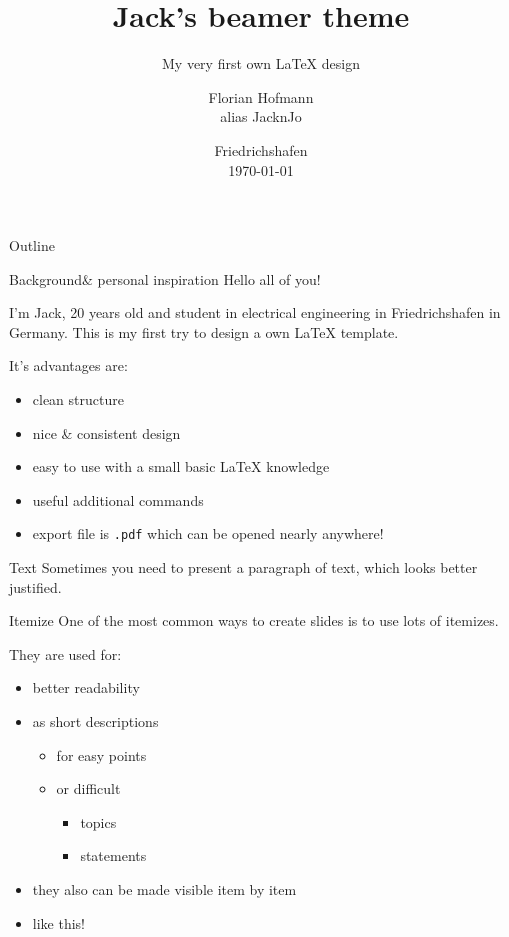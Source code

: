 \documentclass[
	12pt, 				%
	t,					%
	aspectratio=169,	%
	]{beamer}
\title{Jack's beamer theme}
\subtitle{My very first own \LaTeX{} design}
\author{%
		Florian Hofmann\\
		alias JacknJo
		}
\date{Friedrichshafen\\\today}
\newenvironment{myjustify}{\begin{justify}\vspace*{-0.475cm}}{\end{justify}}
\begin{document}
		
	\begin{frame}[noframenumbering]
		\titlepage
	\end{frame}


	\begin{frame}{Outline}
		\tableofcontents
	\end{frame}


	
	
	\begin{frame}{Background}{\& personal inspiration}
		Hello all of you! 
		
		I'm Jack, 20 years old and student in electrical engineering in Friedrichshafen in Germany.
		This is my first try to design a own \LaTeX{} template.
		
		It's advantages are:
		\begin{itemize}
			\item clean structure
			\item nice \& consistent design
			\item easy to use with a small basic \LaTeX{} knowledge
			\item useful additional commands
			\item export file is \texttt{.pdf} which can be opened nearly anywhere!
		\end{itemize}
	\end{frame}
	
	
	
	
	\begin{frame}{Text}{}
		Sometimes you need to present a paragraph of text, which looks better justified.
		\vfill
		\begin{myjustify}
			\lipsum[2]
		\end{myjustify}
		\vfill
	\end{frame}
	
	
	\begin{frame}{Itemize}{}
		One of the most common ways to create slides is to use lots of itemizes.
		
		They are used for:
		\begin{itemize}
			\item better readability
			\item as short descriptions
			\begin{itemize}
				\item for easy points
				\item or difficult
				\begin{itemize}
					\item topics
					\item statements
				\end{itemize}
			\end{itemize}
			\item <2-> they also can be made visible item by item
			\item <3-> like this!
		\end{itemize}
	\end{frame}
	
\end{document}
